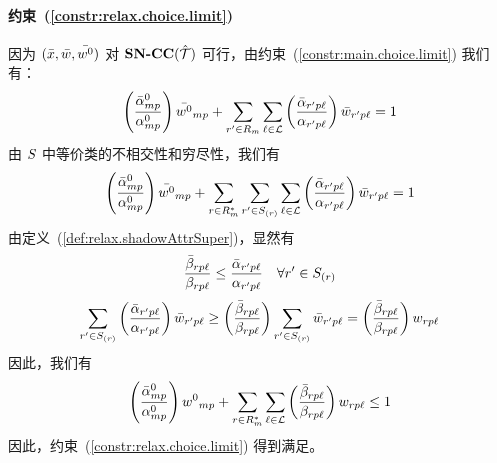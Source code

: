\paragraph*{约束~(\ref{constr:relax.choice.limit})} 因为 $(\bar{x}, \bar{w}, \bar{{w^0}})$ 对 $\textbf{SN-CC}({\hat{\mathcal{T}}})$ 可行，由约束~(\ref{constr:main.choice.limit}) 我们有：
\[
    \left(\frac{\bar{\alpha}^0_{mp}}{\alpha^0_{mp}}\right) \bar{{w^0}}_{mp}
    + \sum_{r' \in R_{m}} \sum_{\ell \in \mathcal{L}} \left(\frac{\bar{\alpha}_{r'p\ell}}{\alpha_{r'p\ell}}\right) \bar{w}_{r'p\ell}
    = 1
\]
由 $S$ 中等价类的不相交性和穷尽性，我们有
\[
    \left(\frac{\bar{\alpha}^0_{mp}}{\alpha^0_{mp}}\right) \bar{{w^0}}_{mp}
    + \sum_{r \in R^{*}_{m}}\sum_{r' \in S_{(r)}} \sum_{\ell \in \mathcal{L}} \left(\frac{\bar{\alpha}_{r'p\ell}}{\alpha_{r'p\ell}}\right) \bar{w}_{r'p\ell}
    = 1
\]
由定义~(\ref{def:relax.shadowAttrSuper})，显然有
\[
    \frac{\bar{\beta}_{rp\ell}}{\beta_{rp\ell}} \le \frac{\bar{\alpha}_{r'p\ell}}{\alpha_{r'p\ell}} \quad \forall r' \in S_{(r)}
\]
\[
    \sum_{r' \in S_{(r)}} \left(\frac{\bar{\alpha}_{r'p\ell}}{\alpha_{r'p\ell}}\right) \bar{w}_{r'p\ell} \ge \left(\frac{\bar{\beta}_{rp\ell}}{\beta_{rp\ell}}\right) \sum_{r' \in S_{(r)}} \bar{w}_{r'p\ell} = \left(\frac{\bar{\beta}_{rp\ell}}{\beta_{rp\ell}}\right) w_{rp\ell}
\]
因此，我们有
\[
    \left(\frac{\bar{\alpha}^0_{mp}}{\alpha^0_{mp}}\right) {w^0}_{mp}
    + \sum_{r \in R^{*}_{m}} \sum_{\ell \in \mathcal{L}} \left(\frac{\bar{\beta}_{rp\ell}}{\beta_{rp\ell}}\right) w_{rp\ell}
    \le 1
\]
因此，约束~(\ref{constr:relax.choice.limit}) 得到满足。

